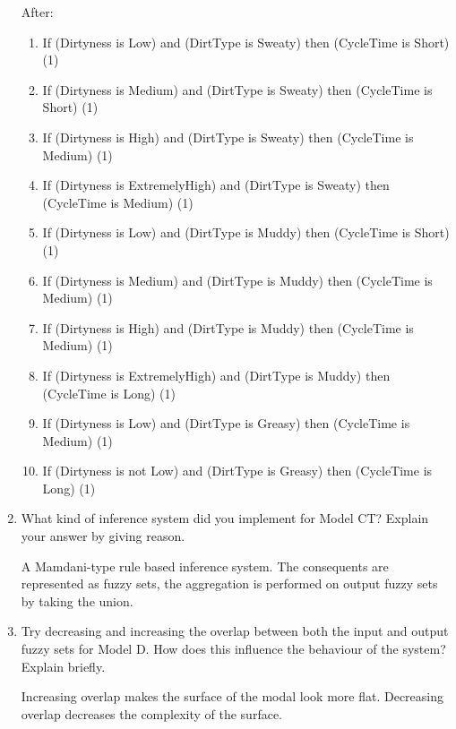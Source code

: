 \documentclass[11pt]{article}
\begin{document}
\begin{enumerate}[label=(\alph*)]
  After:
  \begin{enumerate}[label=(\arabic*)]
    \item If (Dirtyness is Low) and (DirtType is Sweaty) then (CycleTime is
    Short) (1)
    \item If (Dirtyness is Medium) and (DirtType is Sweaty) then (CycleTime is
    Short) (1)
    \item If (Dirtyness is High) and (DirtType is Sweaty) then (CycleTime is
    Medium) (1)
    \item If (Dirtyness is ExtremelyHigh) and (DirtType is Sweaty) then
    (CycleTime is Medium) (1)
    \item If (Dirtyness is Low) and (DirtType is Muddy) then (CycleTime is
    Short) (1)
    \item If (Dirtyness is Medium) and (DirtType is Muddy) then
    (CycleTime is Medium) (1)
    \item If (Dirtyness is High) and (DirtType is Muddy) then (CycleTime is
    Medium) (1)
    \item If (Dirtyness is ExtremelyHigh) and (DirtType is Muddy) then
    (CycleTime is Long) (1)
    \item If (Dirtyness is Low) and (DirtType is Greasy) then (CycleTime is
    Medium) (1)
    \item If (Dirtyness is not Low) and (DirtType is Greasy) then (CycleTime is
    Long) (1)
  \end{enumerate}

  \item What kind of inference system did you implement for Model CT? Explain
  your answer by giving reason.

  A Mamdani-type rule based inference system. The consequents are represented
  as fuzzy sets, the aggregation is performed on output fuzzy sets by taking the
  union.

  \item Try decreasing and increasing the overlap between both the input and
  output fuzzy sets for Model D. How does this influence the behaviour of the
  system? Explain briefly.

  Increasing overlap makes the surface of the modal look more flat. Decreasing
  overlap decreases the complexity of the surface.


\end{enumerate}
\end{document}
